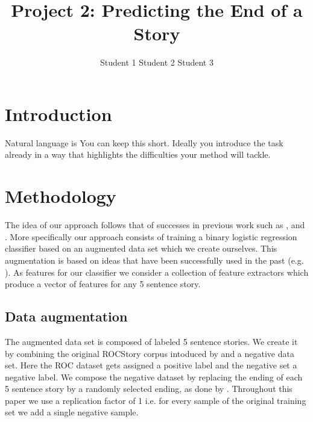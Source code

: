 \documentclass{article}
\title{Project 2: Predicting the End of a Story}
\author{Student 1 \qquad Student 2 \qquad Student 3}
\begin{document}

\maketitle



\section{Introduction}
\label{sec:intro}

Natural language is
You can keep this short. Ideally you introduce the task already in a way that highlights the difficulties  your method will tackle.

\section{Methodology}
The idea of our approach follows that of successes in previous work such as \cite{UWNLP}, \cite{Goel} and \cite{COGCOMP}. More specifically our approach consists of training a binary logistic regression classifier based on an augmented data set which we create ourselves. This augmentation is based on ideas that have been successfully used in the past (e.g. \cite{LSTMClassifier}\cite{SENTENCE_EMB}). As features for our classifier we consider a collection of feature extractors which produce a vector of features for any 5 sentence story.

\subsection{Data augmentation}
The augmented data set is composed of labeled 5 sentence stories. We create it by combining the original ROCStory corpus intoduced by \cite{ROCstories} and a negative data set. Here the ROC dataset gets assigned a positive label and the negative set a negative label. We compose the negative dataset by replacing the ending of each 5 sentence story by a randomly selected ending, as done by \cite{LSTMClassifier}. Throughout this paper we use a replication factor of 1 i.e. for every sample of the original training set we add a single negative sample.
\end{document}
